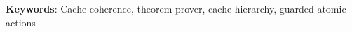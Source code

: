 




\author{
}

\date{}

\maketitle %


\begin{abstract}
%
\end{abstract}


\centerline{\footnotesize {\bf Keywords}: Cache coherence, theorem prover, cache hierarchy, guarded atomic actions}



